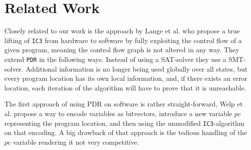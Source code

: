 \documentclass[11pt, a4paper, BCOR=10mm, ngerman]{scrbook}
\begin{document}
\chapter{Related Work}

Closely related to our work is the approach by Lange et al. \cite{DBLP:conf/fmcad/0001NN15} who propose a true lifting of \texttt{IC3} from hardware to software by fully exploiting the control flow of a given program, meaning the control flow graph is not altered in any way. They extend \texttt{PDR} in the following ways. Instead of using a SAT-solver they use a SMT-solver. Additional information is no longer being used globally over all states, but every program location has its own local information, and, if there exists an error location, each iteration of the algorithm will have to prove that it is unreachable. \par

The first approach of using PDR on software is rather straight-forward, Welp et al. \cite{DBLP:conf/date/WelpK13} propose a way to encode variables as bitvectors, introduce a new variable $pc$ representing the program location, and then using the unmodified \texttt{IC3}-algorithm on that encoding. A big drawback of that approach is the tedious handling of the $pc$ variable rendering it not very competitive.
\end{document}
